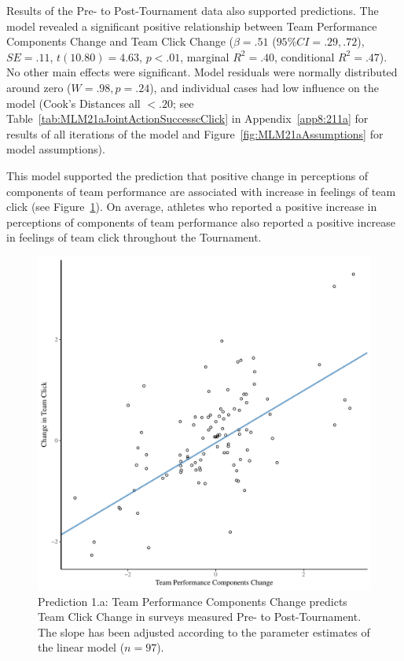 \begin{CJK}{UTF8}{gbsn}
Results of the Pre- to Post-Tournament data also supported predictions.  The model revealed a significant positive relationship between Team Performance Components Change and Team Click Change ($\beta = .51$ ($95\% CI =  .29, .72$), $SE = .11$, $t(10.80) = 4.63$, $p < .01$, marginal $R^2 = .40$, conditional $R^2 = .47$).  No other main effects were significant.  Model residuals were normally distributed around zero ($W = .98, p = .24$), and individual cases had low influence on the model (Cook's Distances all  $< .20 $; see Table~\ref{tab:MLM21aJointActionSuccesscClick} in Appendix~\ref{app8:211a} for results of all iterations of the model and Figure~\ref{fig:MLM21aAssumptions} for model assumptions).

This model supported the prediction that positive change in perceptions of components of team performance are associated with increase in feelings of team click (see Figure~\ref{fig:jasClickDeltaModelSLope}).  On average, athletes who reported a positive increase in perceptions of components of team performance also reported a positive increase in feelings of team click throughout the Tournament.

\begin{figure}[htbp]
  \centering
\includegraphics[scale=.5]{images/jasClickDeltaModelSlope}
  \caption{Prediction 1.a: Team Performance Components Change predicts Team Click Change in surveys measured Pre- to Post-Tournament. The slope has been adjusted according to the parameter estimates of the linear model ($n = 97$).}
  \label{fig:jasClickDeltaModelSLope}
\end{figure}


\end{CJK}
